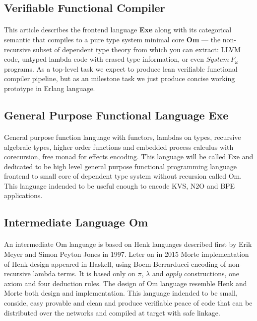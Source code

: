 \documentclass[11pt,oneside]{article}
\begin{document}
\subsection{Verifiable Functional Compiler}

   \paragraph{}
   This article describes the frontend language {\bf Exe} along with its categorical semantic
   that compiles to a pure type system minimal core {\bf Om} --- the
   non-recursive subset of dependent type theory from which you can extract: LLVM code,
   untyped lambda code with erased type information, or even $System\ F_\omega$ programs.
   As a top-level task we expect to produce lean verifiable functional compiler pipeline,
   but as an milestone task we just produce concise working prototype in Erlang language.

\subsection{General Purpose Functional Language Exe}

   \paragraph{}
   General purpose function language with functors, lambdas on types, recursive algebraic types,
   higher order functions and embedded process calculus with corecursion, free monad for effects encoding.
   This language will be called Exe and dedicated to be high level general purpose functional
   programming language frontend to small core of dependent type system without recursion called Om.
   This language indended to be useful enough to encode KVS, N2O and BPE applications.

\subsection{Intermediate Language Om}

   \paragraph{}
   An intermediate Om language is based on Henk\cite{henk} languages described first
   by Erik Meyer and Simon Peyton Jones in 1997. Leter on in 2015 Morte implementation
   of Henk design appeared in Haskell, using Boem-Berrarducci encoding of non-recursive lambda terms.
   It is based only on $\pi$, $\lambda$ and $apply$ constructions, one axiom and four deduction rules.
   The design of Om language resemble Henk and Morte both design and implementation.
   This language indended to be small, conside, easy provable and clean and produce
   verifiable peace of code that can be distributed over the networks and compiled at target with
   safe linkage.
\end{document}
